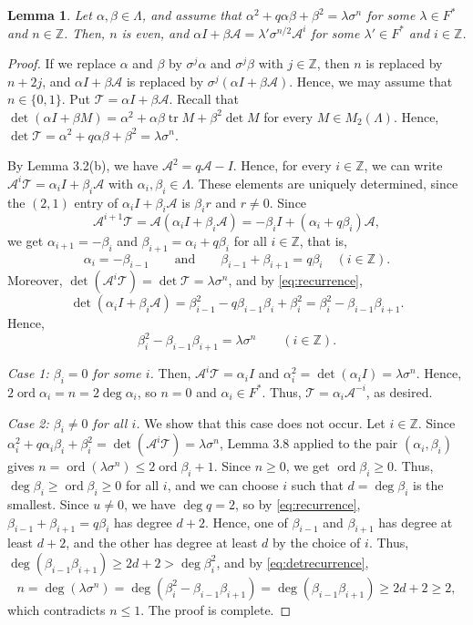 \documentclass[11pt,reqno,a4paper]{amsart}
\numberwithin{equation}{section}
\newtheorem{lemma}[theorem]{Lemma}
\theoremstyle{definition}
\theoremstyle{plain}
\newcommand{\ord}{\operatorname{ord}}
\newcommand{\tr}{\operatorname{tr}}
\newcommand{\bbZ}{\mathbb Z}
\newcommand{\Acal}{\mathcal A}
\newcommand{\Tcal}{\mathcal T}
\begin{document}
\begin{lemma}
Let $\alpha,\beta\in\Lambda$, and assume that $\alpha^2+q\alpha\beta+\beta^2=\lambda\sigma^n$ for some $\lambda\in F^*$ and $n\in\bbZ$. Then, $n$ is even, and $\alpha I+\beta\Acal=\lambda'\sigma^{n/2}\Acal^i$ for some $\lambda'\in F^*$ and $i\in\bbZ$.
\end{lemma}
\begin{proof}
If we replace $\alpha$ and $\beta$ by $\sigma^j\alpha$ and $\sigma^j\beta$ with $j\in\bbZ$, then $n$ is replaced by $n+2j$, and $\alpha I+\beta\Acal$ is replaced by $\sigma^j(\alpha I+\beta\Acal)$. Hence, we may assume that $n\in\{0,1\}$. Put $\Tcal=\alpha I+\beta\Acal$. Recall that $\det(\alpha I+\beta M)=\alpha^2+\alpha\beta\tr M+\beta^2\det M$ for every $M\in M_2(\Lambda)$. Hence, $\det\Tcal=\alpha^2+q\alpha\beta+\beta^2=\lambda\sigma^n$.

By Lemma 3.2(b), we have $\Acal^2=q\Acal-I$. Hence, for every $i\in\bbZ$, we can write $\Acal^i\Tcal=\alpha_iI+\beta_i\Acal$ with $\alpha_i,\beta_i\in\Lambda$. These elements are uniquely determined, since the $(2,1)$ entry of $\alpha_iI+\beta_i\Acal$ is $\beta_i r$ and $r\ne0$. Since
\[
\Acal^{i+1}\Tcal=\Acal(\alpha_iI+\beta_i\Acal)=-\beta_iI+(\alpha_i+q\beta_i)\Acal,
\]
we get $\alpha_{i+1}=-\beta_i$ and $\beta_{i+1}=\alpha_i+q\beta_i$ for all $i\in\bbZ$, that is,
\begin{equation}\label{eq:recurrence}
\alpha_i=-\beta_{i-1}\qquad\text{and}\qquad\beta_{i-1}+\beta_{i+1}=q\beta_i\quad(i\in\bbZ).
\end{equation}
Moreover, $\det(\Acal^i\Tcal)=\det\Tcal=\lambda\sigma^n$, and by \eqref{eq:recurrence},
\[
\det(\alpha_iI+\beta_i\Acal)=\beta_{i-1}^2-q\beta_{i-1}\beta_i+\beta_i^2=\beta_i^2-\beta_{i-1}\beta_{i+1}.
\]
Hence,
\begin{equation}\label{eq:detrecurrence}
\beta_i^2-\beta_{i-1}\beta_{i+1}=\lambda\sigma^n\qquad(i\in\bbZ).
\end{equation}

\emph{Case 1: $\beta_i=0$ for some $i$.} Then, $\Acal^i\Tcal=\alpha_iI$ and $\alpha_i^2=\det(\alpha_iI)=\lambda\sigma^n$. Hence, $2\ord\alpha_i=n=2\deg\alpha_i$, so $n=0$ and $\alpha_i\in F^*$. Thus, $\Tcal=\alpha_i\Acal^{-i}$, as desired.

\emph{Case 2: $\beta_i\ne0$ for all $i$.} We show that this case does not occur. Let $i\in\bbZ$. Since $\alpha_i^2+q\alpha_i\beta_i+\beta_i^2=\det(\Acal^i\Tcal)=\lambda\sigma^n$, Lemma 3.8 applied to the pair $(\alpha_i,\beta_i)$ gives $n=\ord(\lambda\sigma^n)\le2\ord\beta_i+1$. Since $n\ge0$, we get $\ord\beta_i\ge0$. Thus, $\deg\beta_i\ge\ord\beta_i\ge0$ for all $i$, and we can choose $i$ such that $d=\deg\beta_i$ is the smallest. Since $u\ne0$, we have $\deg q=2$, so by \eqref{eq:recurrence}, $\beta_{i-1}+\beta_{i+1}=q\beta_i$ has degree $d+2$. Hence, one of $\beta_{i-1}$ and $\beta_{i+1}$ has degree at least $d+2$, and the other has degree at least $d$ by the choice of $i$. Thus, $\deg(\beta_{i-1}\beta_{i+1})\ge2d+2>\deg\beta_i^2$, and by \eqref{eq:detrecurrence},
\[
n=\deg(\lambda\sigma^n)=\deg(\beta_i^2-\beta_{i-1}\beta_{i+1})
=\deg(\beta_{i-1}\beta_{i+1})\ge2d+2\ge2,
\]
which contradicts $n\le1$. The proof is complete.
\end{proof}
\end{document}
